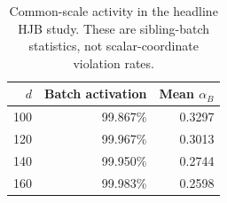 \begin{table}[htbp]
\centering\small
\caption{Common-scale activity in the headline HJB study. These are sibling-batch statistics, not scalar-coordinate violation rates.}\label{tab:extended-activity}
\begin{tabular}{@{}rrr@{}}
\toprule
$d$ & Batch activation & Mean $\alpha_B$\\
\midrule
100 & 99.867\% & 0.3297\\
120 & 99.967\% & 0.3013\\
140 & 99.950\% & 0.2744\\
160 & 99.983\% & 0.2598\\
\bottomrule
\end{tabular}
\end{table}
